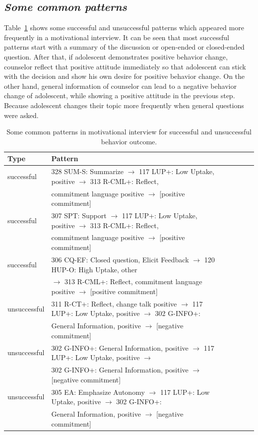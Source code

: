 \documentclass{amia}
\begin{document}
\subsection*{\textit{Some common patterns}}
Table~\ref{tab:common_patterns} shows some successful and unsuccessful patterns which appeared more frequently in a motivational interview. It can be seen that most successful patterns start with a summary of the discussion or open-ended or closed-ended question. After that, if adolescent demonstrates positive behavior change, counselor reflect that positive attitude immediately so that adolescent can stick with the decision and show his own desire for positive behavior change. On the other hand, general information of counselor can lead to a negative behavior change of adolescent, while showing a positive attitude in the previous step. Because adolescent changes their topic more frequently when general questions were asked.   

\begin{table}[h]
\centering
\caption{Some common patterns in motivational interview for successful and unsuccessful behavior outcome.}
\label{tab:common_patterns}
  \begin{tabular}{|l|l|l|l|l|l|}
  \hline
   \textbf{Type} & \textbf{Pattern} \\ \hline      
successful & 328 SUM-S: Summarize $\rightarrow $ 117 LUP+: Low Uptake, positive $\rightarrow $ 313 R-CML+: Reflect, \\ 
& commitment language positive $\rightarrow $ [positive commitment] \\\hline
successful & 307 SPT: Support $\rightarrow $ 117 LUP+: Low Uptake, positive $\rightarrow $ 313 R-CML+: Reflect, \\
& commitment language positive $\rightarrow $ [positive commitment] \\\hline
successful & 306 CQ-EF: Closed question, Elicit Feedback $\rightarrow $ 120 HUP-O: High Uptake, other \\
& $\rightarrow $ 313 R-CML+: Reflect, commitment language positive $\rightarrow $ [positive commitment] \\\hline
unsuccessful & 311 R-CT+: Reflect, change talk positive $\rightarrow $ 117 LUP+: Low Uptake, positive $\rightarrow $ 302 G-INFO+:  \\
& General Information, positive $\rightarrow $ [negative commitment] \\\hline
unsuccessful & 302 G-INFO+: General Information, positive $\rightarrow $ 117 LUP+: Low Uptake, positive $\rightarrow $  \\
& 302 G-INFO+: General Information, positive $\rightarrow $ [negative commitment] \\\hline
unsuccessful & 305 EA: Emphasize Autonomy $\rightarrow $ 117 LUP+: Low Uptake, positive $\rightarrow $ 302 G-INFO+:  \\
& General Information, positive $\rightarrow $ [negative commitment] \\\hline
  \end{tabular}
\end{table} 
\end{document}
